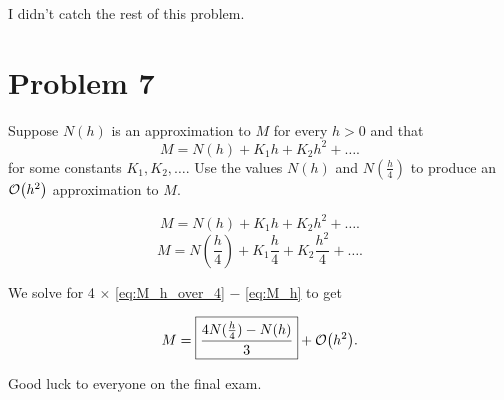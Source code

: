 \documentclass[12pt]{article}
\begin{document}
I didn't catch the rest of this problem.

\section{Problem 7}
Suppose $N(h)$ is an approximation to $M$ for every $h>0$ and that
\[
  M=N(h) + K_1h + K_2h^2 + \dots
.\]
for some constants $K_1, K_2, \dots$. Use the values $N(h)$ and $N(\frac{h}{4})$
to produce an $\order{h^2}$ approximation to $M$.

\begin{equation}
  M = N(h) + K_1h + K_2h^2 + \dots
  \label{eq:M_h}
.\end{equation}
\begin{equation}
  M = N(\frac{h}{4}) + K_1\frac{h}{4} + K_2\frac{h^2}{4} + \dots
  \label{eq:M_h_over_4}
.\end{equation}

We solve for 4 $\times$ \eqref{eq:M_h_over_4} $-$ \eqref{eq:M_h} to get

\[
  M = \boxed{\frac{4N(\frac{h}{4}) - N(h)}{3}} + \order{h^2}
.\]

Good luck to everyone on the final exam.
\end{document}
